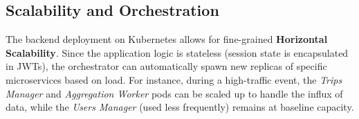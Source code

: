 \subsection*{Scalability and Orchestration}
The backend deployment on Kubernetes allows for fine-grained \textbf{Horizontal Scalability}.
Since the application logic is stateless (session state is encapsulated in JWTs), the orchestrator can automatically spawn new replicas of specific microservices based on load. For instance, during a high-traffic event, the \emph{Trips Manager} and \emph{Aggregation Worker} pods can be scaled up to handle the influx of data, while the \emph{Users Manager} (used less frequently) remains at baseline capacity.